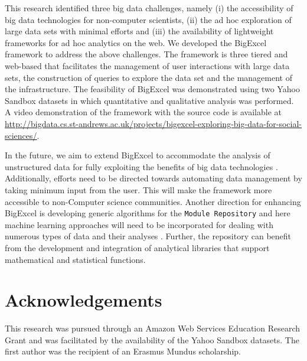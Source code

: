 \documentclass[10pt, conference, compsocconf]{IEEEtran}
\begin{document}
This research identified three big data challenges, namely (i) the accessibility of big data technologies for non-computer scientists, (ii) the ad hoc exploration of large data sets with minimal efforts and (iii) the availability of lightweight frameworks for ad hoc analytics on the web. We developed the BigExcel framework to address the above challenges. The framework is three tiered and web-based that facilitates the management of user interactions with large data sets, the construction of queries to explore the data set and the management of the infrastructure. The feasibility of BigExcel was demonstrated using two Yahoo Sandbox datasets in which quantitative and qualitative analysis was performed. A video demonstration of the framework with the source code is available at \url{http://bigdata.cs.st-andrews.ac.uk/projects/bigexcel-exploring-big-data-for-social-sciences/}. 

In the future, we aim to extend BigExcel to accommodate the analysis of unstructured data for fully exploiting the benefits of big data technologies \cite{bigdata-2, bigdata-3}. Additionally, efforts need to be directed towards automating data management by taking minimum input from the user. This will make the framework more accessible to non-Computer science communities. Another direction for enhancing BigExcel is developing generic algorithms for the \texttt{Module Repository} and here machine learning approaches will need to be incorporated for dealing with numerous types of data and their analyses \cite{bigdata-2}. Further, the repository can benefit from the development and integration of analytical libraries that support mathematical and statistical functions.

\section{Acknowledgements}

This research was pursued through an Amazon Web Services Education Research Grant and was facilitated by the availability of the Yahoo Sandbox datasets. The first author was the recipient of an Erasmus Mundus scholarship. 
\end{document}
